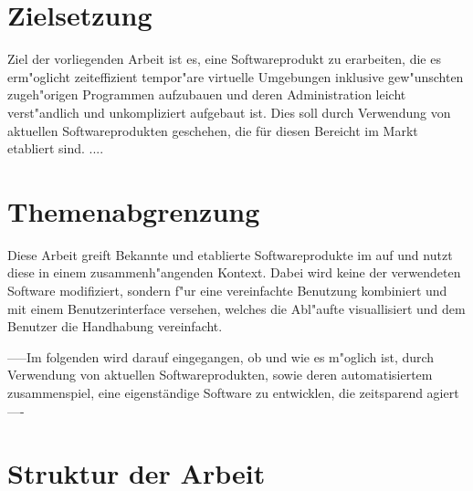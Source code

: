 \section{Zielsetzung}
Ziel der vorliegenden Arbeit ist es, eine Softwareprodukt zu erarbeiten, die es erm"oglicht zeiteffizient tempor"are virtuelle Umgebungen inklusive gew"unschten zugeh"origen Programmen aufzubauen und deren Administration leicht verst"andlich und unkompliziert aufgebaut ist.
Dies soll durch Verwendung von aktuellen Softwareprodukten geschehen, die für diesen Bereicht im Markt etabliert sind.\newline
....


\section{Themenabgrenzung}
Diese Arbeit greift Bekannte und etablierte Softwareprodukte im auf und nutzt diese in einem zusammenh"angenden Kontext. Dabei wird keine der verwendeten Software modifiziert, sondern f"ur eine vereinfachte Benutzung kombiniert und mit einem Benutzerinterface versehen, welches die Abl"aufte visuallisiert und dem Benutzer die Handhabung vereinfacht.


-----Im folgenden wird darauf eingegangen, ob und wie es m"oglich ist, durch Verwendung von aktuellen Softwareprodukten, sowie deren automatisiertem zusammenspiel, eine eigenständige Software zu entwicklen, die zeitsparend agiert----

\section{Struktur der Arbeit}









